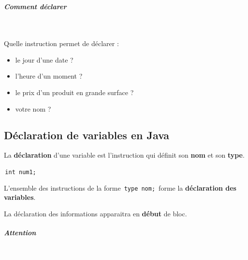 \documentclass[11pt,a4paper]{article}
\begin{document}
            \par
        
			
		\subparagraph{Comment d\'eclarer} 
		
                \textcolor{white}{.} \par
            
							  Quelle instruction permet de d\'eclarer :
							
					\begin{itemize}
				
			\item le jour d'une date ? \textcolor{gray}{\underline{\hspace*{10em}}} 
			\item l'heure d'un moment ?  \textcolor{gray}{\underline{\hspace*{10em}}} 
			\item le prix d'un produit en grande surface ? \textcolor{gray}{\underline{\hspace*{10em}}} 
			\item votre nom ?  \textcolor{gray}{\underline{\hspace*{10em}}} 
					\end{itemize}
				\subsection{D\'eclaration de variables en Java}
          La \textbf{d\'eclaration} d'une variable est l'instruction qui d\'efinit son \textbf{nom} 
          et son \textbf{type}.
        
            \par
        \,\verb|int num1;|\,
            \par
        
          L'ensemble des instructions de la forme \,\verb|type nom;|\,
          forme la \textbf{d\'eclaration des variables}. 
        
            \par
        
          La d\'eclaration des informations apparaitra en \textbf{d\'ebut} de bloc.
        
            \par
        
			
		\subparagraph{Attention} 
		
					\textcolor{white}{.} \par
				
            \par
        
\end{document}
